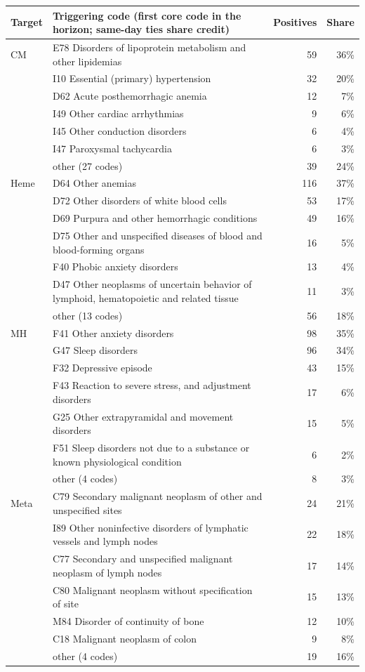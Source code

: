 \begin{tabular}{llrr}
\hline
Target & Triggering code (first core code in the horizon; same-day ties share credit) & Positives & Share \\
\hline
CM & E78 Disorders of lipoprotein metabolism and other lipidemias & 59 & 36\% \\
 & I10 Essential (primary) hypertension & 32 & 20\% \\
 & D62 Acute posthemorrhagic anemia & 12 & 7\% \\
 & I49 Other cardiac arrhythmias & 9 & 6\% \\
 & I45 Other conduction disorders & 6 & 4\% \\
 & I47 Paroxysmal tachycardia & 6 & 3\% \\
 & other (27 codes) & 39 & 24\% \\
\hline
Heme & D64 Other anemias & 116 & 37\% \\
 & D72 Other disorders of white blood cells & 53 & 17\% \\
 & D69 Purpura and other hemorrhagic conditions & 49 & 16\% \\
 & D75 Other and unspecified diseases of blood and blood-forming organs & 16 & 5\% \\
 & F40 Phobic anxiety disorders & 13 & 4\% \\
 & D47 Other neoplasms of uncertain behavior of lymphoid, hematopoietic and related tissue & 11 & 3\% \\
 & other (13 codes) & 56 & 18\% \\
\hline
MH & F41 Other anxiety disorders & 98 & 35\% \\
 & G47 Sleep disorders & 96 & 34\% \\
 & F32 Depressive episode & 43 & 15\% \\
 & F43 Reaction to severe stress, and adjustment disorders & 17 & 6\% \\
 & G25 Other extrapyramidal and movement disorders & 15 & 5\% \\
 & F51 Sleep disorders not due to a substance or known physiological condition & 6 & 2\% \\
 & other (4 codes) & 8 & 3\% \\
\hline
Meta & C79 Secondary malignant neoplasm of other and unspecified sites & 24 & 21\% \\
 & I89 Other noninfective disorders of lymphatic vessels and lymph nodes & 22 & 18\% \\
 & C77 Secondary and unspecified malignant neoplasm of lymph nodes & 17 & 14\% \\
 & C80 Malignant neoplasm without specification of site & 15 & 13\% \\
 & M84 Disorder of continuity of bone & 12 & 10\% \\
 & C18 Malignant neoplasm of colon & 9 & 8\% \\
 & other (4 codes) & 19 & 16\% \\
\hline
\end{tabular}
